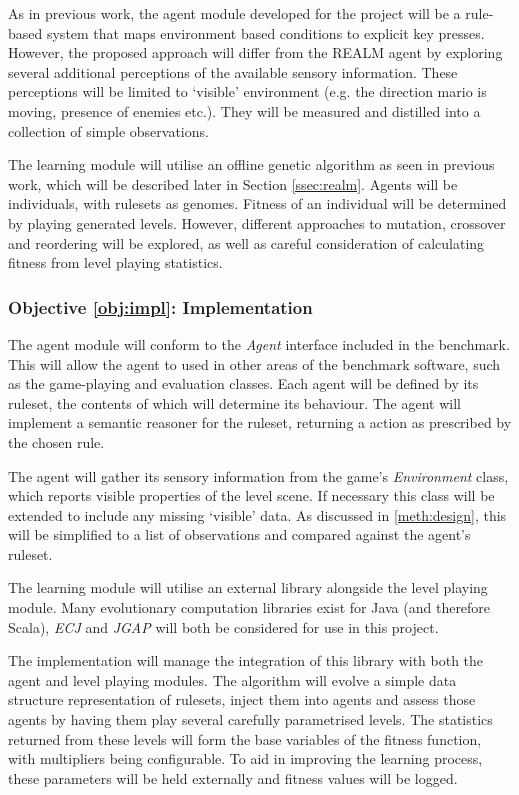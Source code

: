 As in previous work, the agent module developed for the project will be a rule-based system that maps environment based conditions to explicit key presses. However, the proposed approach will differ from the REALM agent by exploring several additional perceptions of the available sensory information. These perceptions will be limited to `visible' environment (e.g. the direction mario is moving, presence of enemies etc.). They will be measured and distilled into a collection of simple observations.

The learning module will utilise an offline genetic algorithm as seen in previous work, which will be described later in Section \ref{ssec:realm}. Agents will be individuals, with rulesets as genomes. Fitness of an individual will be determined by playing generated levels. However, different approaches to mutation, crossover and reordering will be explored, as well as careful consideration of calculating fitness from level playing statistics.

\subsubsection*{Objective \ref{obj:impl}: Implementation}
\label{meth:impl}

The agent module will conform to the \emph{Agent} interface included in the benchmark. This will allow the agent to used in other areas of the benchmark software, such as the game-playing and evaluation classes. Each agent will be defined by its ruleset, the contents of which will determine its behaviour. The agent will implement a semantic reasoner for the ruleset, returning a action as prescribed by the chosen rule.

The agent will gather its sensory information from the game's \emph{Environment} class, which reports visible properties of the level scene. If necessary this class will be extended to include any missing `visible' data. As discussed in \ref{meth:design}, this will be simplified to a list of observations and compared against the agent's ruleset.

\vspace{\baselineskip}

The learning module will utilise an external library alongside the level playing module. Many evolutionary computation libraries exist for Java (and therefore Scala), \emph{ECJ} \cite{ecj} and \emph{JGAP} \cite{jgap} will both be considered for use in this project.

The implementation will manage the integration of this library with both the agent and level playing modules. The algorithm will evolve a simple data structure representation of rulesets, inject them into agents and assess those agents by having them play several carefully parametrised levels. The statistics returned from these levels will form the base variables of the fitness function, with multipliers being configurable. To aid in improving the learning process, these parameters will be held externally and fitness values will be logged.

